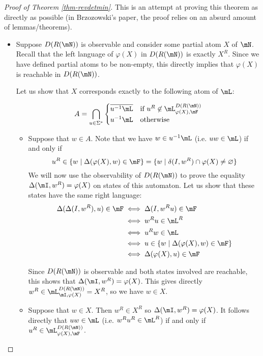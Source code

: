 \documentclass[a4paper, UKenglish, cleveref, autoref, numberwithinsect]{lipics-modified}
\begin{document}
\begin{proof}[Proof of Theorem \ref{thm-revdetmin}] This is an attempt at proving this theorem as directly as possible (in Brzozowski's paper, the proof relies on an absurd amount of lemmas/theorems).

\begin{itemize}

\item Suppose $D(R(\mN))$ is observable and consider some partial atom $X$ of $\mN$. Recall that the left language of $\varphi(X)$ in $D(R(\mN))$ is exactly $X^R$. Since we have defined partial atoms to be non-empty, this directly implies that $\varphi(X)$ is reachable in $D(R(\mN))$. 

Let us show that $X$ corresponds exactly to the following atom of $\mL$:

$$A = \bigcap_{u\in\Sigma^*}\begin{cases}\overline{u^{-1}\mL} & \text{if }u^R\not\in\mL_{\varphi(X),\mF}^{D(R(\mN))}\\u^{-1}\mL & \text{otherwise}\end{cases}$$

\begin{itemize}

\item Suppose that $w\in A$. Note that we have $w\in u^{-1}\mL$ (i.e. $uw\in\mL$) if and only if $$u^R\in\{w\mid\Delta(\varphi(X),w)\in\mF\}=\{w\mid\delta(I,w^R)\cap\varphi(X)\neq\varnothing\}$$ 
We will now use the observability of $D(R(\mN))$ to prove the equality $\Delta(\mI,w^R)=\varphi(X)$ on states of this automaton. Let us show that these states have the same right language:
\begin{align*}
\Delta(\Delta(I,w^R),u)\in\mF&\iff\Delta(I,w^Ru)\in\mF\\
&\iff w^Ru\in\mL^R\\
&\iff u^Rw\in\mL\\
&\iff u\in\{w\mid\Delta(\varphi(X),w)\in\mF\}\\
&\iff\Delta(\varphi(X),u)\in\mF
\end{align*}

Since $D(R(\mN))$ is observable and both states involved are reachable, this shows that $\Delta(\mI,w^R)=\varphi(X)$. This gives directly $w^R\in \mL_{\mI,\varphi(X)}^{D(R(\mN))}=X^R$, so we have $w\in X$.

\item Suppose that $w\in X$. Then $w^R\in X^R$ so $\Delta(\mI,w^R)=\varphi(X)$. It follows directly that $uw\in\mL$ (i.e. $w^Ru^R\in\mL^R$) if and only if $u^R\in\mL_{\varphi(X),\mF}^{D(R(\mN))}$.


\end{itemize}
\end{itemize}
\end{proof}
\end{document}
